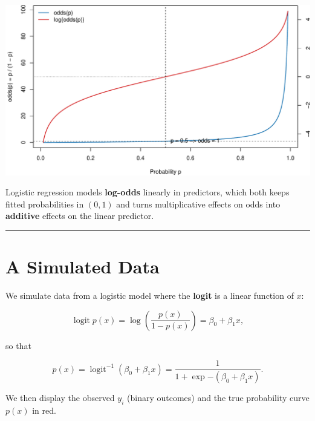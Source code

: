 \documentclass[
  letterpaper,
]{scrbook}
\begin{document}
\includegraphics{unit4-lr/logistic_files/figure-pdf/plot-odds-colored-1.pdf}

Logistic regression models \textbf{log-odds} linearly in predictors,
which both keeps fitted probabilities in \((0,1)\) and turns
multiplicative effects on odds into \textbf{additive} effects on the
linear predictor.

\begin{center}\rule{0.5\linewidth}{0.5pt}\end{center}

\section{A Simulated Data}\label{a-simulated-data}

We simulate data from a logistic model where the \textbf{logit} is a
linear function of \(x\):

\[
\operatorname{logit}{p(x)}
=
\log\left(\frac{p(x)}{1-p(x)}\right)
=
\beta_0 + \beta_1 x,
\]

so that

\[
p(x)
=
\operatorname{logit}^{-1}(\beta_0+\beta_1 x)
=
\frac{1}{1+\exp{-(\beta_0+\beta_1 x)}}.
\]

We then display the observed \(y_i\) (binary outcomes) and the true
probability curve \(p(x)\) in red.
\end{document}
